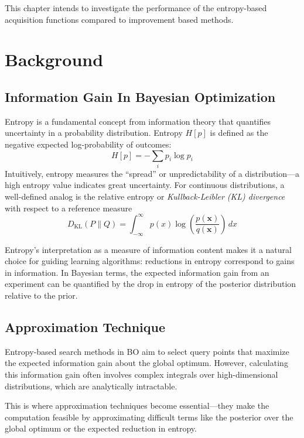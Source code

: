 \documentclass{ut-thesis}
\begin{document}
This chapter intends to investigate the performance of the entropy-based acquisition functions compared to improvement based methods.

\section{Background}

\subsection{Information Gain In Bayesian Optimization}
Entropy is a fundamental concept from information theory that quantifies uncertainty in a probability distribution. Entropy $H[p]$ 
is defined as the negative expected log-probability of outcomes\cite{6773024}:
\begin{equation}
    H[p] = -\sum_i p_i \log p_i
\end{equation}
Intuitively, entropy measures the “spread” or unpredictability of a distribution—a high entropy value indicates great uncertainty. For continuous distributions, a well-defined analog is the relative entropy or \emph{Kullback-Leibler (KL) divergence} with respect to a reference measure\cite{kullback1968information}
\begin{equation}
    D_{\mathrm{KL}}(P \| Q) = \int_{-\infty}^{\infty} p(x) \log \left( \frac{p(\mathbf{x})}{q(\mathbf{x})} \right) \, dx
\end{equation}

Entropy’s interpretation as a measure of information content makes it a natural choice for guiding learning algorithms: reductions in entropy correspond to gains in information. In Bayesian terms, the expected information gain from an experiment can be quantified by the drop in entropy of the posterior distribution relative to the prior.


\subsection{Approximation Technique}
Entropy-based search methods in BO aim to select query points that maximize the expected information gain about the global optimum. However, calculating this information gain often involves complex integrals over high-dimensional distributions, which are analytically intractable. 

This is where approximation techniques become essential—they make the computation feasible by approximating difficult terms like the posterior over the global optimum or the expected reduction in entropy. 
\end{document}
